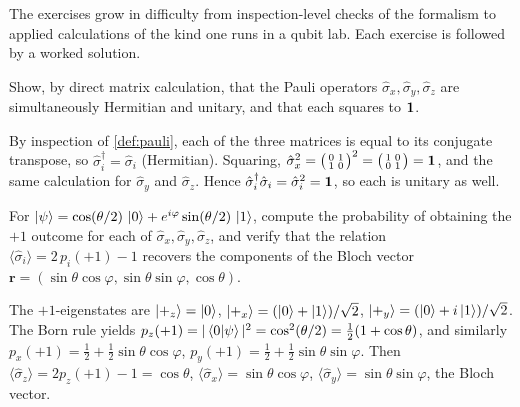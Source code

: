The exercises grow in difficulty from inspection-level checks of
the formalism to applied calculations of the kind one runs in a
qubit lab. Each exercise is followed by a worked solution.

\begin{exercise}
Show, by direct matrix calculation, that the Pauli operators
$\hat\sigma_x,\hat\sigma_y,\hat\sigma_z$ are simultaneously
Hermitian and unitary, and that each squares to $\mathbf{1}$.
\begin{solution}
By inspection of \cref{def:pauli}, each of the three matrices is
equal to its conjugate transpose, so
$\hat\sigma_i^\dagger=\hat\sigma_i$ (Hermitian). Squaring,
$\hat\sigma_x^2=\bigl(\begin{smallmatrix}0&1\\1&0\end{smallmatrix}\bigr)^2
=\bigl(\begin{smallmatrix}1&0\\0&1\end{smallmatrix}\bigr)=\mathbf{1}$,
and the same calculation for $\hat\sigma_y$ and $\hat\sigma_z$.
Hence $\hat\sigma_i^\dagger \hat\sigma_i=\hat\sigma_i^2=\mathbf{1}$, so
each is unitary as well.
\end{solution}
\end{exercise}

\begin{exercise}
For $\ket{\psi}=\cos(\theta/2)\,\ket{0}+e^{i\varphi}\sin(\theta/2)\,\ket{1}$,
compute the probability of obtaining the $+1$ outcome for each of
$\hat\sigma_x,\hat\sigma_y,\hat\sigma_z$, and verify that the
relation $\langle\hat\sigma_i\rangle=2\,p_i(+1)-1$ recovers the
components of the Bloch vector
$\bm{r}=(\sin\theta\cos\varphi,\sin\theta\sin\varphi,\cos\theta)$.
\begin{solution}
The $+1$-eigenstates are $\ket{+_z}=\ket{0}$,
$\ket{+_x}=(\ket{0}+\ket{1})/\sqrt 2$,
$\ket{+_y}=(\ket{0}+i\ket{1})/\sqrt 2$. The Born rule yields
$p_z(+1)=|\bra{0}\ket{\psi}|^2=\cos^2(\theta/2)
=\tfrac12(1+\cos\theta)$, and similarly
$p_x(+1)=\tfrac12+\tfrac12\sin\theta\cos\varphi$,
$p_y(+1)=\tfrac12+\tfrac12\sin\theta\sin\varphi$.
Then $\langle\hat\sigma_z\rangle=2p_z(+1)-1=\cos\theta$,
$\langle\hat\sigma_x\rangle=\sin\theta\cos\varphi$,
$\langle\hat\sigma_y\rangle=\sin\theta\sin\varphi$, the Bloch
vector.
\end{solution}
\end{exercise}

